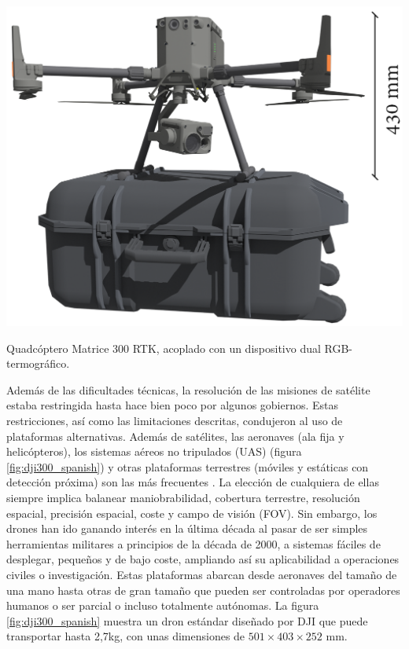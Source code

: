 \begin{marginfigure}[.7cm]
	\includegraphics{figs/introduction/dji300.png}
	\caption{Quadcóptero Matrice 300 RTK, acoplado con un dispositivo dual RGB-termográfico. }
	\label{fig:dji300_spanish}
\end{marginfigure}
Además de las dificultades técnicas, la resolución de las misiones de satélite estaba restringida hasta hace bien poco por algunos gobiernos. Estas restricciones, así como las limitaciones descritas, condujeron al uso de plataformas alternativas. Además de satélites, las aeronaves (ala fija y helicópteros), los sistemas aéreos no tripulados (UAS) (figura \ref{fig:dji300_spanish}) y otras plataformas terrestres (móviles y estáticas con detección próxima) son las más frecuentes \cite{lillesand_remote_2015}. La elección de cualquiera de ellas siempre implica balanear maniobrabilidad, cobertura terrestre, resolución espacial, precisión espacial, coste y campo de visión (FOV). Sin embargo, los drones han ido ganando interés en la última década al pasar de ser simples herramientas militares a principios de la década de 2000, a sistemas fáciles de desplegar, pequeños y de bajo coste, ampliando así su aplicabilidad a operaciones civiles o investigación. Estas plataformas abarcan desde aeronaves del tamaño de una mano hasta otras de gran tamaño que pueden ser controladas por operadores humanos o ser parcial o incluso totalmente autónomas. La figura \ref{fig:dji300_spanish} muestra un dron estándar diseñado por DJI que puede transportar hasta 2,7\si{\kilo\gram}, con unas dimensiones de $501 \times 403 \times 252$ \si{\milli\meter}.

